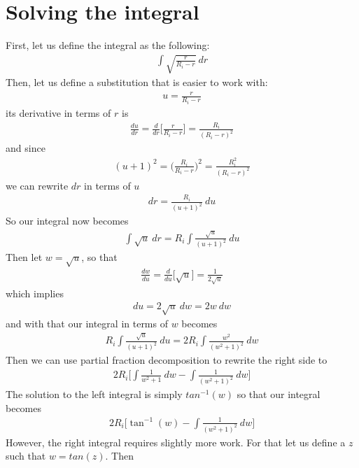 \documentclass{article}
\begin{document}
\section{Solving the integral}
First, let us define the integral as the following:
\begin{align}
    \int \sqrt{\frac{r}{R_i - r}} ~ dr
\end{align}
Then, let us define a substitution that is easier to work with:
\begin{align}
    u = \frac{r}{R_i - r}
\end{align}
its derivative in terms of $r$ is
\begin{align}
    \frac{du}{dr} = \frac{d}{dr}\Bigg[ \frac{r}{R_i - r} \Bigg] = \frac{R_i}{(R_i - r)^2}
\end{align}
and since
\begin{align}
    (u + 1)^2 = \biggr(\frac{R_i}{R_i - r}\biggl)^2 = \frac{R_i^2}{(R_i - r)^2}
\end{align}
we can rewrite $dr$ in terms of $u$
\begin{align}
    dr = \frac{R_i}{(u+1)^2} ~du
\end{align}
So our integral now becomes
\begin{align}
    \int \sqrt{u} ~ dr = R_i \int \frac{\sqrt{u}}{(u + 1)^2} ~ du
\end{align}
Then let $w = \sqrt{u}$, so that
\begin{align}
    \frac{dw}{du} = \frac{d}{du} \biggl[ \sqrt{u} \biggr] = \frac{1}{2\sqrt{u}}
\end{align}
which implies
\begin{align}
    du = 2\sqrt{u}~dw = 2w~ dw
\end{align}
and with that our integral in terms of $w$ becomes
\begin{align}
    R_i \int \frac{\sqrt{u}}{(u + 1)^2} ~ du = 2R_i \int \frac{w^2}{(w^2 + 1)^2}~ dw
\end{align}
Then we can use partial fraction decomposition to rewrite the right side to
\begin{align}
    2R_i \Biggl[ \int \frac{1}{w^2 + 1} ~dw - \int \frac{1}{(w^2 + 1)^2} ~dw \Biggr]
\end{align}
The solution to the left integral is simply $tan^{-1}(w)$ so that our integral becomes
\begin{align}
    \label{eq:solution_w}
    2R_i \Biggl[ \tan^{-1}(w) - \int \frac{1}{(w^2 + 1)^2} ~dw \Biggr]
\end{align}
However, the right integral requires slightly more work. For that let us define a $z$ such that $w = tan(z)$. Then
\end{document}
